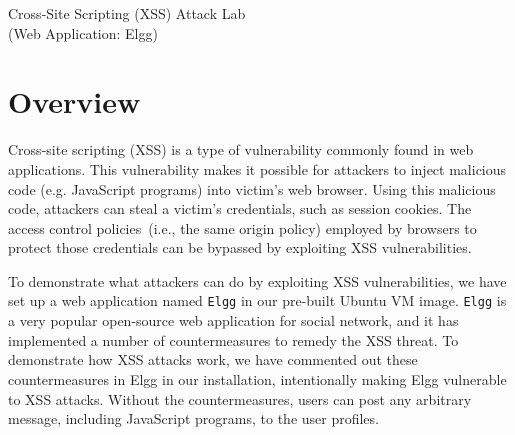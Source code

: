 
\newcommand{\commonfolder}{../../common-files}
\newcommand{\webcommon}{../Web_Common}









\begin{center}
{\LARGE Cross-Site Scripting (XSS) Attack Lab}
\vspace{0.1in}\\
{\Large (Web Application: Elgg)}
\end{center}


\section{Overview}

Cross-site scripting (XSS) is a type of vulnerability commonly found
in web applications. This vulnerability makes it possible for
attackers to inject malicious code (e.g. JavaScript programs) into victim's
web browser. Using this malicious code, attackers can steal a
victim's credentials, such as session cookies. The access control 
policies~(i.e., the same origin policy) employed by browsers to protect
those credentials can be bypassed by exploiting XSS vulnerabilities.

To demonstrate what attackers can do by exploiting XSS
vulnerabilities, we have set up a web application named 
{\tt Elgg} in our pre-built Ubuntu VM image.
{\tt Elgg} is a very popular open-source web application for
social network, and it has implemented a number of countermeasures 
to remedy the XSS threat. To demonstrate how XSS attacks work, we 
have commented out these countermeasures in Elgg in our installation, 
intentionally making Elgg vulnerable to XSS attacks.  
Without the countermeasures, users 
can post any arbitrary message, including JavaScript
programs, to the user profiles.  

